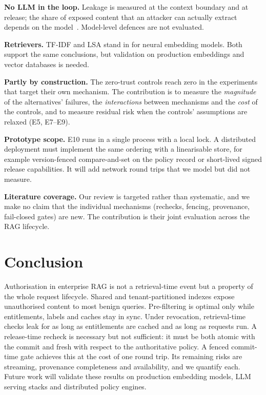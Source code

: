 \documentclass[10pt]{article}
\begin{document}
\textbf{No LLM in the loop.} Leakage is measured at the context boundary and at release; the share of exposed content that an attacker can actually extract depends on the model~\cite{zeng2024good,qi2024spill}. Model-level defences are not evaluated.

\textbf{Retrievers.} TF-IDF and LSA stand in for neural embedding models. Both support the same conclusions, but validation on production embeddings and vector databases is needed.

\textbf{Partly by construction.} The zero-trust controls reach zero in the experiments that target their own mechanism. The contribution is to measure the \emph{magnitude} of the alternatives' failures, the \emph{interactions} between mechanisms and the \emph{cost} of the controls, and to measure residual risk when the controls' assumptions are relaxed (E5, E7--E9).

\textbf{Prototype scope.} E10 runs in a single process with a local lock. A distributed deployment must implement the same ordering with a linearisable store, for example version-fenced compare-and-set on the policy record or short-lived signed release capabilities. It will add network round trips that we model but did not measure.

\textbf{Literature coverage.} Our review is targeted rather than systematic, and we make no claim that the individual mechanisms (rechecks, fencing, provenance, fail-closed gates) are new. The contribution is their joint evaluation across the RAG lifecycle.

\section{Conclusion}
Authorisation in enterprise RAG is not a retrieval-time event but a property of the whole request lifecycle. Shared and tenant-partitioned indexes expose unauthorised content to most benign queries. Pre-filtering is optimal only while entitlements, labels and caches stay in sync. Under revocation, retrieval-time checks leak for as long as entitlements are cached and as long as requests run. A release-time recheck is necessary but not sufficient: it must be both atomic with the commit and fresh with respect to the authoritative policy. A fenced commit-time gate achieves this at the cost of one round trip. Its remaining risks are streaming, provenance completeness and availability, and we quantify each. Future work will validate these results on production embedding models, LLM serving stacks and distributed policy engines.
\end{document}
